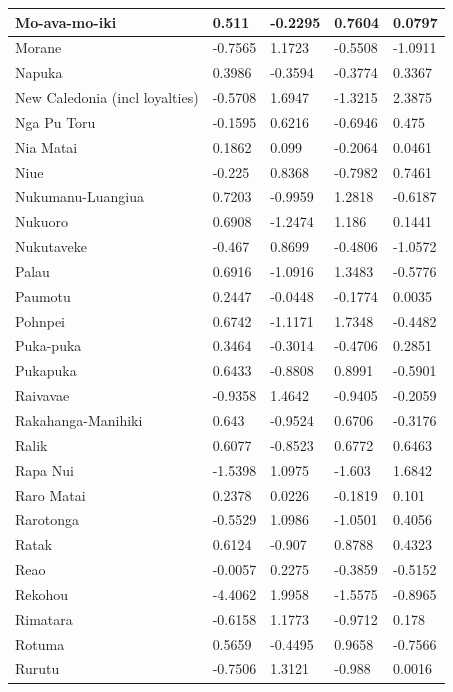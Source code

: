 \documentclass[draft,10pt]{article} %
\begin{document}
\begin{landscape}
\begin{longtable}{| p{2.6cm} |  p{2cm} | p{2cm}  | p{2cm}  | p{2cm}|}
 Mo-ava-mo-iki & 0.511 & -0.2295 & 0.7604 & 0.0797 \\ \hline
 Morane & -0.7565 & 1.1723 & -0.5508 & -1.0911 \\ \hline
 Napuka & 0.3986 & -0.3594 & -0.3774 & 0.3367 \\ \hline
 New Caledonia (incl loyalties) & -0.5708 & 1.6947 & -1.3215 & 2.3875 \\ \hline
 Nga Pu Toru & -0.1595 & 0.6216 & -0.6946 & 0.475 \\ \hline
 Nia Matai & 0.1862 & 0.099 & -0.2064 & 0.0461 \\ \hline
 Niue & -0.225 & 0.8368 & -0.7982 & 0.7461 \\ \hline
 Nukumanu-Luangiua & 0.7203 & -0.9959 & 1.2818 & -0.6187 \\ \hline
 Nukuoro & 0.6908 & -1.2474 & 1.186 & 0.1441 \\ \hline
 Nukutaveke & -0.467 & 0.8699 & -0.4806 & -1.0572 \\ \hline
 Palau & 0.6916 & -1.0916 & 1.3483 & -0.5776 \\ \hline
 Paumotu & 0.2447 & -0.0448 & -0.1774 & 0.0035 \\ \hline
 Pohnpei & 0.6742 & -1.1171 & 1.7348 & -0.4482 \\ \hline
 Puka-puka & 0.3464 & -0.3014 & -0.4706 & 0.2851 \\ \hline
 Pukapuka & 0.6433 & -0.8808 & 0.8991 & -0.5901 \\ \hline
 Raivavae & -0.9358 & 1.4642 & -0.9405 & -0.2059 \\ \hline
 Rakahanga-Manihiki & 0.643 & -0.9524 & 0.6706 & -0.3176 \\ \hline
 Ralik & 0.6077 & -0.8523 & 0.6772 & 0.6463 \\ \hline
 Rapa Nui & -1.5398 & 1.0975 & -1.603 & 1.6842 \\ \hline
 Raro Matai & 0.2378 & 0.0226 & -0.1819 & 0.101 \\ \hline
 Rarotonga & -0.5529 & 1.0986 & -1.0501 & 0.4056 \\ \hline
 Ratak & 0.6124 & -0.907 & 0.8788 & 0.4323 \\ \hline
 Reao & -0.0057 & 0.2275 & -0.3859 & -0.5152 \\ \hline
 Rekohou & -4.4062 & 1.9958 & -1.5575 & -0.8965 \\ \hline
 Rimatara & -0.6158 & 1.1773 & -0.9712 & 0.178 \\ \hline
 Rotuma & 0.5659 & -0.4495 & 0.9658 & -0.7566 \\ \hline
 Rurutu & -0.7506 & 1.3121 & -0.988 & 0.0016 \\ \hline

\end{longtable}
\end{landscape}
\end{document}
